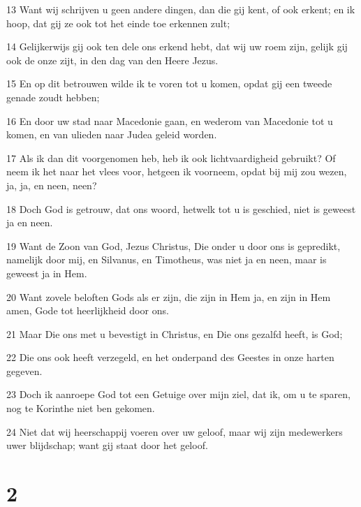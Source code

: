 \par 13 Want wij schrijven u geen andere dingen, dan die gij kent, of ook erkent; en ik hoop, dat gij ze ook tot het einde toe erkennen zult;
\par 14 Gelijkerwijs gij ook ten dele ons erkend hebt, dat wij uw roem zijn, gelijk gij ook de onze zijt, in den dag van den Heere Jezus.
\par 15 En op dit betrouwen wilde ik te voren tot u komen, opdat gij een tweede genade zoudt hebben;
\par 16 En door uw stad naar Macedonie gaan, en wederom van Macedonie tot u komen, en van ulieden naar Judea geleid worden.
\par 17 Als ik dan dit voorgenomen heb, heb ik ook lichtvaardigheid gebruikt? Of neem ik het naar het vlees voor, hetgeen ik voorneem, opdat bij mij zou wezen, ja, ja, en neen, neen?
\par 18 Doch God is getrouw, dat ons woord, hetwelk tot u is geschied, niet is geweest ja en neen.
\par 19 Want de Zoon van God, Jezus Christus, Die onder u door ons is gepredikt, namelijk door mij, en Silvanus, en Timotheus, was niet ja en neen, maar is geweest ja in Hem.
\par 20 Want zovele beloften Gods als er zijn, die zijn in Hem ja, en zijn in Hem amen, Gode tot heerlijkheid door ons.
\par 21 Maar Die ons met u bevestigt in Christus, en Die ons gezalfd heeft, is God;
\par 22 Die ons ook heeft verzegeld, en het onderpand des Geestes in onze harten gegeven.
\par 23 Doch ik aanroepe God tot een Getuige over mijn ziel, dat ik, om u te sparen, nog te Korinthe niet ben gekomen.
\par 24 Niet dat wij heerschappij voeren over uw geloof, maar wij zijn medewerkers uwer blijdschap; want gij staat door het geloof.

\chapter{2}

